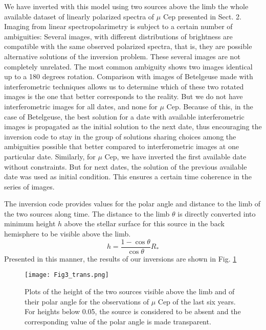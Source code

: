 \documentclass{/Users/art2/TeX/aanda/aa}
\begin{document}
We have inverted with this model using two sources above the limb the whole available dataset of linearly polarized spectra of $\mu$ Cep presented in Sect. 2. Imaging from linear spectropolarimetry is subject to a certain number of ambiguities: Several images, with different distributions of brightness are compatible with the same observed polarized spectra,
that is, they are possible alternative solutions of the inversion problem. These several images are not completely unrelated. The most common ambiguity shows two images identical up to a 180 degrees rotation. Comparison with images of Betelgeuse made with interferometric techniques allows us to determine which of these two rotated images is the one that better corresponds to the reality. But we do not have interferometric images for all dates, and none for $\mu$ Cep. Because of this, in the case of Betelgeuse, the best solution for a date with available interferometric images is propagated as the initial solution to the next date, thus encouraging the inversion code to stay in the group of solutions sharing choices among the ambiguities possible that better compared to interferometric images at one particular date. Similarly, for $\mu$ Cep, we have inverted the first available date without constraints. But for next dates, the solution of the previous available date was used as initial condition. This ensures a certain time coherence in the series of images. 

The inversion code provides  values for the polar angle and distance to the limb of the two sources along time. The distance to the limb $\theta$ is directly converted into minimum height $h$ above the stellar surface for this source  in the back hemisphere to be visible above the limb. 
\begin{equation}
h=\frac{1-\cos \theta}{\cos \theta} R_{*}
\end{equation}
Presented in this manner, the results of our inversions are shown in Fig. \ref{height}


\begin{figure*}
\texttt{[image: Fig3\_trans.png]}
\caption{Plots of  the height of the two sources visible above the limb and of their polar angle for the observations of  $\mu$ Cep of the last six years. For heights below 0.05, the source is considered to be absent and the corresponding value of the polar angle is made transparent.}
\label{height}
\end{figure*}
\end{document}
